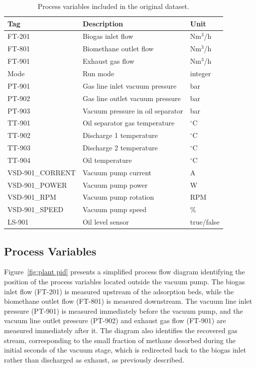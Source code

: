 \begin{table}[htbp]
\centering
\caption{Process variables included in the original dataset.}
\label{tab:dataset_variables}

\begin{tabular}{lll}
\hline
\textbf{Tag} & \textbf{Description} & \textbf{Unit} \\
\hline
FT-201           & Biogas inlet flow                     & Nm$^3$/h \\
FT-801           & Biomethane outlet flow                & Nm$^3$/h \\
FT-901           & Exhaust gas flow                       & Nm$^3$/h \\
Mode             & Run mode                               & integer \\
PT-901           & Gas line inlet vacuum pressure         & bar \\
PT-902           & Gas line outlet vacuum pressure        & bar \\
PT-903           & Vacuum pressure in oil separator       & bar \\
TT-901           & Oil separator gas temperature          & $^\circ$C \\
TT-902           & Discharge 1 temperature                & $^\circ$C \\
TT-903           & Discharge 2 temperature                & $^\circ$C \\
TT-904           & Oil temperature                        & $^\circ$C \\
VSD-901\_CORRENT & Vacuum pump current                    & A \\
VSD-901\_POWER   & Vacuum pump power                      & W \\
VSD-901\_RPM     & Vacuum pump rotation                   & RPM \\
VSD-901\_SPEED   & Vacuum pump speed                      & \% \\
LS-901           & Oil level sensor                       & true/false \\
\hline
\end{tabular}
\end{table}

\subsection{Process Variables} \label{sec:process_variables}

Figure~\ref{fig:plant pid} presents a simplified process flow diagram identifying the position of the 
process variables located outside the vacuum pump. The biogas inlet flow (FT-201) is measured upstream 
of the adsorption beds, while the biomethane outlet flow (FT-801) is measured downstream. 
The vacuum line inlet pressure (PT-901) is measured immediately before the vacuum pump, and the 
vacuum line outlet pressure (PT-902) and exhaust gas flow (FT-901) are measured immediately after it. The 
diagram also identifies the recovered gas stream, corresponding to the small fraction of methane 
desorbed during the initial seconds of the vacuum stage, which is redirected back to the biogas inlet 
rather than discharged as exhaust, as previously described.

